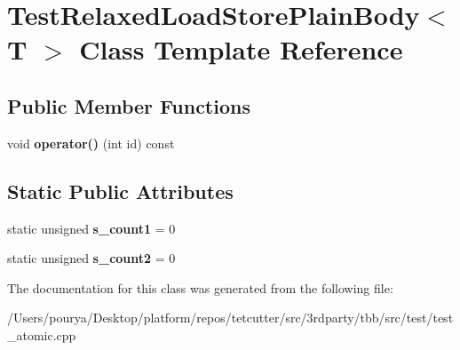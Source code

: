 \hypertarget{classTestRelaxedLoadStorePlainBody}{}\section{Test\+Relaxed\+Load\+Store\+Plain\+Body$<$ T $>$ Class Template Reference}
\label{classTestRelaxedLoadStorePlainBody}
\subsection*{Public Member Functions}
\begin{DoxyCompactItemize}
\item 
\hypertarget{classTestRelaxedLoadStorePlainBody_a4b891b173fc7e0254401f28046e536bf}{}void {\bfseries operator()} (int id) const \label{classTestRelaxedLoadStorePlainBody_a4b891b173fc7e0254401f28046e536bf}

\end{DoxyCompactItemize}
\subsection*{Static Public Attributes}
\begin{DoxyCompactItemize}
\item 
\hypertarget{classTestRelaxedLoadStorePlainBody_a2a115cc818a3847d3a88282875b30ddb}{}static unsigned {\bfseries s\+\_\+count1} = 0\label{classTestRelaxedLoadStorePlainBody_a2a115cc818a3847d3a88282875b30ddb}

\item 
\hypertarget{classTestRelaxedLoadStorePlainBody_a5827b0649fe39568b4c21fa6f6afc488}{}static unsigned {\bfseries s\+\_\+count2} = 0\label{classTestRelaxedLoadStorePlainBody_a5827b0649fe39568b4c21fa6f6afc488}

\end{DoxyCompactItemize}


The documentation for this class was generated from the following file\+:\begin{DoxyCompactItemize}
\item 
/\+Users/pourya/\+Desktop/platform/repos/tetcutter/src/3rdparty/tbb/src/test/test\+\_\+atomic.\+cpp\end{DoxyCompactItemize}
